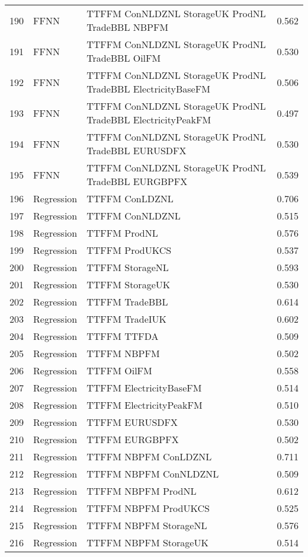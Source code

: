 \begin{table}[ht]
\begin{tabular}{rllr}
  190 & FFNN & TTFFM ConNLDZNL StorageUK ProdNL TradeBBL NBPFM & 0.562 \\ 
  191 & FFNN & TTFFM ConNLDZNL StorageUK ProdNL TradeBBL OilFM & 0.530 \\ 
  192 & FFNN & TTFFM ConNLDZNL StorageUK ProdNL TradeBBL ElectricityBaseFM & 0.506 \\ 
  193 & FFNN & TTFFM ConNLDZNL StorageUK ProdNL TradeBBL ElectricityPeakFM & 0.497 \\ 
  194 & FFNN & TTFFM ConNLDZNL StorageUK ProdNL TradeBBL EURUSDFX & 0.530 \\ 
  195 & FFNN & TTFFM ConNLDZNL StorageUK ProdNL TradeBBL EURGBPFX & 0.539 \\ 
  196 & Regression & TTFFM ConLDZNL & 0.706 \\ 
  197 & Regression & TTFFM ConNLDZNL & 0.515 \\ 
  198 & Regression & TTFFM ProdNL & 0.576 \\ 
  199 & Regression & TTFFM ProdUKCS & 0.537 \\ 
  200 & Regression & TTFFM StorageNL & 0.593 \\ 
  201 & Regression & TTFFM StorageUK & 0.530 \\ 
  202 & Regression & TTFFM TradeBBL & 0.614 \\ 
  203 & Regression & TTFFM TradeIUK & 0.602 \\ 
  204 & Regression & TTFFM TTFDA & 0.509 \\ 
  205 & Regression & TTFFM NBPFM & 0.502 \\ 
  206 & Regression & TTFFM OilFM & 0.558 \\ 
  207 & Regression & TTFFM ElectricityBaseFM & 0.514 \\ 
  208 & Regression & TTFFM ElectricityPeakFM & 0.510 \\ 
  209 & Regression & TTFFM EURUSDFX & 0.530 \\ 
  210 & Regression & TTFFM EURGBPFX & 0.502 \\ 
  211 & Regression & TTFFM NBPFM ConLDZNL & 0.711 \\ 
  212 & Regression & TTFFM NBPFM ConNLDZNL & 0.509 \\ 
  213 & Regression & TTFFM NBPFM ProdNL & 0.612 \\ 
  214 & Regression & TTFFM NBPFM ProdUKCS & 0.525 \\ 
  215 & Regression & TTFFM NBPFM StorageNL & 0.576 \\ 
  216 & Regression & TTFFM NBPFM StorageUK & 0.514 \\ 

\end{tabular}
\end{table}
